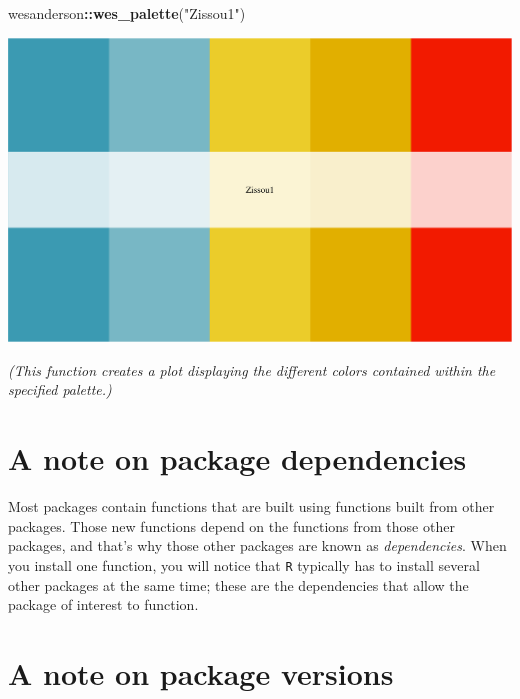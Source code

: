 \documentclass[
]{book}
\newenvironment{Shaded}{\begin{snugshade}}{\end{snugshade}}
\newcommand{\KeywordTok}[1]{\textcolor[rgb]{0.13,0.29,0.53}{\textbf{#1}}}
\newcommand{\NormalTok}[1]{#1}
\newcommand{\OperatorTok}[1]{\textcolor[rgb]{0.81,0.36,0.00}{\textbf{#1}}}
\newcommand{\StringTok}[1]{\textcolor[rgb]{0.31,0.60,0.02}{#1}}
\begin{document}
\begin{Shaded}
\begin{Highlighting}[]
\NormalTok{wesanderson}\OperatorTok{::}\KeywordTok{wes_palette}\NormalTok{(}\StringTok{"Zissou1"}\NormalTok{)}
\end{Highlighting}
\end{Shaded}

\includegraphics{figures/unnamed-chunk-132-2.pdf}

\emph{(This function creates a plot displaying the different colors contained within the specified palette.)}

\hypertarget{a-note-on-package-dependencies}{%
\section*{A note on package dependencies}\label{a-note-on-package-dependencies}}

Most packages contain functions that are built using functions built from other packages. Those new functions depend on the functions from those other packages, and that's why those other packages are known as \emph{dependencies}. When you install one function, you will notice that \texttt{R} typically has to install several other packages at the same time; these are the dependencies that allow the package of interest to function.

\hypertarget{a-note-on-package-versions}{%
\section*{A note on package versions}\label{a-note-on-package-versions}}
\end{document}
